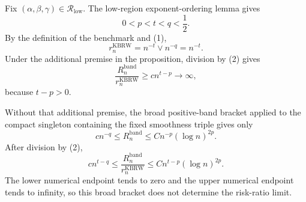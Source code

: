 Fix \((\alpha,\beta,\gamma)\in\mathcal R_{\mathrm{low}}\).  The
low-region exponent-ordering lemma gives
\[
0<p<t<q<\frac12.
\tag{1}
\]
By the definition of the benchmark and (1),
\[
r_n^{\mathrm{KBRW}}=n^{-t}\vee n^{-q}=n^{-t}.
\tag{2}
\]
Under the additional premise in the proposition, division by (2) gives
\[
\frac{R_n^{\mathrm{band}}}{r_n^{\mathrm{KBRW}}}
\geq cn^{t-p}\longrightarrow\infty,
\]
because \(t-p>0\).

Without that additional premise, the broad positive-band bracket applied to
the compact singleton containing the fixed smoothness triple gives only
\[
cn^{-q}\leq R_n^{\mathrm{band}}
\leq Cn^{-p}(\log n)^{2p}.
\]
After division by (2),
\[
cn^{t-q}\leq
\frac{R_n^{\mathrm{band}}}{r_n^{\mathrm{KBRW}}}
\leq Cn^{t-p}(\log n)^{2p}.
\]
The lower numerical endpoint tends to zero and the upper numerical endpoint
tends to infinity, so this broad bracket does not determine the risk-ratio
limit.